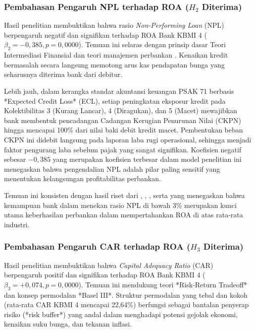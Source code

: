 \documentclass[12pt,a4paper]{article}
\numberwithin{equation}{section}
\begin{document}
\subsubsection{Pembahasan Pengaruh NPL terhadap ROA \texorpdfstring{($H_2$ Diterima)}{(H2 Diterima)}}
\noindent
Hasil penelitian membuktikan bahwa rasio \emph{Non-Performing Loan} (NPL) berpengaruh negatif dan signifikan terhadap ROA Bank KBMI 4 ($\beta_2 = -0{,}385, p = 0{,}0000$). Temuan ini selaras dengan prinsip dasar Teori Intermediasi Finansial \citep{GurleyShaw1960, Diamond1984} dan teori manajemen perbankan \citep{KuncoroSuhardjono2018}. Kenaikan kredit bermasalah secara langsung memotong arus kas pendapatan bunga yang seharusnya diterima bank dari debitur.

\noindent
Lebih jauh, dalam kerangka standar akuntansi keuangan PSAK 71 berbasis *Expected Credit Loss* (ECL), setiap peningkatan eksposur kredit pada Kolektibilitas 3 (Kurang Lancar), 4 (Diragukan), dan 5 (Macet) mewajibkan bank membentuk pencadangan Cadangan Kerugian Penurunan Nilai (CKPN) hingga mencapai 100\% dari nilai baki debit kredit macet. Pembentukan beban CKPN ini didebit langsung pada laporan laba rugi operasional, sehingga menjadi faktor pengurang laba sebelum pajak yang sangat signifikan. Koefisien negatif sebesar $-0{,}385$ yang merupakan koefisien terbesar dalam model penelitian ini menegaskan bahwa pengendalian NPL adalah pilar paling sensitif yang menentukan kelangsungan profitabilitas perbankan.

\noindent
Temuan ini konsisten dengan hasil riset dari \citet{PraditaSyaichu2022}, \citet{HandayaniSubowo2022}, \citet{HaryantoSudarno2023}, serta \citet{Dendawijaya2015} yang menegaskan bahwa kemampuan bank dalam menekan rasio NPL di bawah 3\% merupakan kunci utama keberhasilan perbankan dalam mempertahankan ROA di atas rata-rata industri.

\subsubsection{Pembahasan Pengaruh CAR terhadap ROA \texorpdfstring{($H_3$ Diterima)}{(H3 Diterima)}}
\noindent
Hasil penelitian membuktikan bahwa \emph{Capital Adequacy Ratio} (CAR) berpengaruh positif dan signifikan terhadap ROA Bank KBMI 4 ($\beta_3 = +0{,}074, p = 0{,}0000$). Temuan ini mendukung teori *Risk-Return Tradeoff* \citep{BrighamEhrhardt2020} dan konsep permodalan *Basel III*. Struktur permodalan yang tebal dan kokoh (rata-rata CAR KBMI 4 mencapai 22,64\%) berfungsi sebagai bantalan penyerap risiko (*risk buffer*) yang andal dalam menghadapi potensi gejolak ekonomi, kenaikan suku bunga, dan tekanan inflasi.
\end{document}
